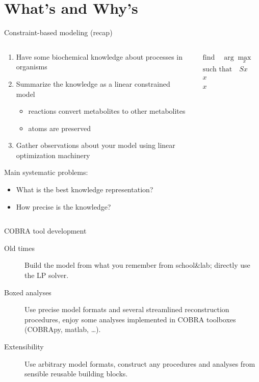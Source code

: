 \documentclass[aspectratio=169]{beamer}
\begin{document}
\section{What's and Why's}

\begin{frame}{Constraint-based modeling (recap)}
\begin{columns}
\begin{column}{.7\linewidth}
\begin{enumerate}
\item Have some biochemical knowledge about processes in organisms
\item Summarize the knowledge as a linear constrained model
  \begin{itemize}
    \item reactions convert metabolites to other metabolites
    \item atoms are preserved
  \end{itemize}
\item Gather observations about your model using linear optimization machinery
\end{enumerate}

Main systematic problems:
\begin{itemize}
\item What is the best knowledge representation?
\item How precise is the knowledge?
\end{itemize}
\end{column}
\begin{column}{.3\linewidth}
\begin{align*}
\text{find}\quad\arg\max_x &\phantom{=} c^T x \\
\text{such that}\quad S x &= 0 \\
x &\geq u \\
x &\leq l \\
\end{align*}
\end{column}
\end{columns}
\end{frame}

\begin{frame}{COBRA tool development}
\begin{description}
\item[Old times] Build the model from what you remember from school\&lab; directly use the LP solver.
\item[Boxed analyses] Use precise model formats and several streamlined reconstruction procedures, enjoy some analyses implemented in COBRA toolboxes (COBRApy, matlab, \dots).
\item[Extensibility] Use arbitrary model formats, construct any procedures and analyses from sensible reusable building blocks.
\end{description}
\end{frame}
\end{document}
